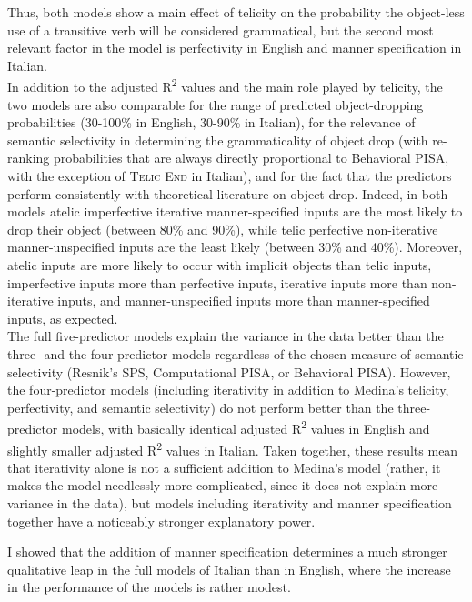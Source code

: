 Thus, both models show a main effect of telicity on the probability the object-less use of a transitive verb will be considered grammatical, but the second most relevant factor in the model is perfectivity in English and manner specification in Italian.\\
In addition to the adjusted R\textsuperscript{2} values and the main role played by telicity, the two models are also comparable for the range of predicted object-dropping probabilities (30-100\% in English, 30-90\% in Italian), for the relevance of semantic selectivity in determining the grammaticality of object drop (with re-ranking probabilities that are always directly proportional to Behavioral PISA, with the exception of \textsc{Telic End} in Italian), and for the fact that the predictors perform consistently with theoretical literature on object drop. Indeed, in both models atelic imperfective iterative manner-specified inputs are the most likely to drop their object (between 80\% and 90\%), while telic perfective non-iterative manner-unspecified inputs are the least likely (between 30\% and 40\%). Moreover, atelic inputs are more likely to occur with implicit objects than telic inputs, imperfective inputs more than perfective inputs, iterative inputs more than non-iterative inputs, and manner-unspecified inputs more than manner-specified inputs, as expected.\\

The full five-predictor models explain the variance in the data better than the three- and the four-predictor models regardless of the chosen measure of semantic selectivity (Resnik's SPS, Computational PISA, or Behavioral PISA). However, the four-predictor models (including iterativity in addition to Medina's telicity, perfectivity, and semantic selectivity) do not perform better than the three-predictor models, with basically identical adjusted R\textsuperscript{2} values in English and slightly smaller adjusted R\textsuperscript{2} values in Italian. Taken together, these results mean that iterativity alone is not a sufficient addition to Medina's model (rather, it makes the model needlessly more complicated, since it does not explain more variance in the data), but models including iterativity and manner specification together have a noticeably stronger explanatory power.

I showed that the addition of manner specification determines a much stronger qualitative leap in the full models of Italian than in English, where the increase in the performance of the models is rather modest.

